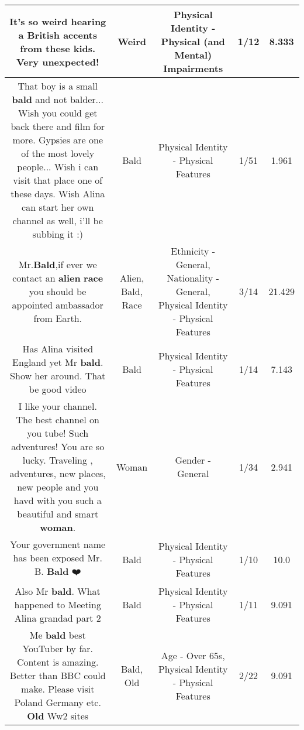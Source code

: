 \documentclass[11pt]{article}
\newlength\mylength
\begin{document}
\begin{center}
\begin{longtable}{|C{.65\mylength}|C{.30\mylength}|C{.12\mylength}|C{.12\mylength}|C{.12\mylength}|}
  \small It's so \textbf{weird} hearing a British accents from these kids. Very unexpected!\normalsize   & Weird & Physical Identity - Physical (and Mental) Impairments & 1/12 & 8.333 \\  \hline
  \small That boy is a small \textbf{bald} and not balder... Wish you could get back there and film for more. Gypsies are one of the most lovely people... Wish i can visit that place one of these days. Wish Alina can start her own channel as well, i'll be subbing it :)\normalsize   & Bald & Physical Identity - Physical Features & 1/51 & 1.961 \\  \hline
  \small Mr.\textbf{Bald},if ever we contact an \textbf{alien} \textbf{race} you should be appointed ambassador from  Earth.\normalsize   & Alien, Bald, Race & Ethnicity - General, Nationality - General, Physical Identity - Physical Features & 3/14 & 21.429 \\  \hline
  \small Has Alina visited England yet Mr \textbf{bald}. Show her around.  That be good video\normalsize   & Bald & Physical Identity - Physical Features & 1/14 & 7.143 \\  \hline
  \small I like your channel. The best channel on you tube! Such adventures! You are so lucky. Traveling , adventures, new places, new people and you havd with you such a beautiful and smart \textbf{woman}.\normalsize   & Woman & Gender - General & 1/34 & 2.941 \\  \hline
  \small Your government name has been exposed Mr. B. \textbf{Bald} ❤️\normalsize   & Bald & Physical Identity - Physical Features & 1/10 & 10.0 \\  \hline
  \small Also Mr \textbf{bald}. What happened to Meeting Alina grandad part 2\normalsize   & Bald & Physical Identity - Physical Features & 1/11 & 9.091 \\  \hline
  \small Me \textbf{bald} best YouTuber by far. Content is amazing.  Better than BBC could make. Please visit Poland Germany etc. \textbf{Old} Ww2 sites\normalsize   & Bald, Old & Age - Over 65s, Physical Identity - Physical Features & 2/22 & 9.091 \\  \hline

\end{longtable}
\end{center}
\end{document}

